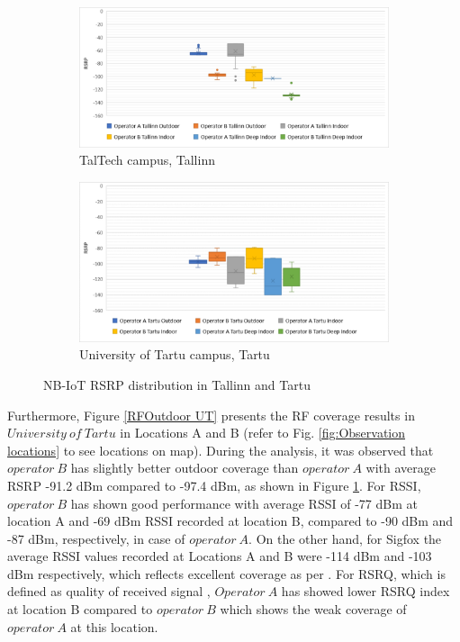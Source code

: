 \documentclass[12pt]{article}
\begin{document}
 \begin{figure}[h!]
\begin{subfigure}[t]{\linewidth}
  \centering
  \includegraphics[width=.5\linewidth]{Images/tallinn/TallinnRSRPboxplot.pdf}  
  \caption{TalTech campus, Tallinn}
\end{subfigure}
\begin{subfigure}[t]{\linewidth}
  \centering
  \includegraphics[width=.5\linewidth]{Images/tartu/TartuRSRPboxplot.pdf}  
  \caption{University of Tartu campus, Tartu}
  
\end{subfigure}
\caption{NB-IoT RSRP distribution in Tallinn and Tartu}
 \label{boxplot}
\end{figure}

Furthermore, Figure \ref{RFOutdoor UT} presents the RF coverage results  in $University\ of\  Tartu$ in Locations A and B (refer to Fig. \ref{fig:Observation locations} to see locations on map). During the analysis, it was observed that $operator\ B$ has slightly better outdoor coverage than $operator\ A $ with average RSRP -91.2 dBm compared to -97.4 dBm, as shown in Figure \ref{boxplot}. For RSSI, $operator\ B$ has shown good performance with average RSSI of -77 dBm at location A and -69 dBm RSSI recorded at location B, compared to -90 dBm and -87 dBm, respectively, in case of $operator\ A$. On the other hand, for Sigfox the average RSSI values recorded at Locations A and B were -114 dBm and -103 dBm respectively, which reflects excellent coverage as per \cite{sigfoxRSSI}. For RSRQ, which is defined as quality of received signal \cite{3GPP}, $Operator\ A$ has showed lower RSRQ index at location B compared to $operator\ B$ which shows the weak coverage of $operator\ A$ at this location.\par
\end{document}
